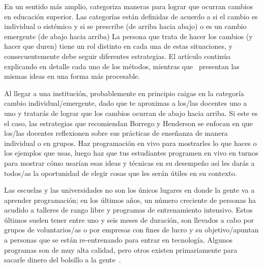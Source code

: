 En un sentido más amplio,
\cite{Borr2014} categoriza maneras para lograr que ocurran cambios en educación superior.
Las categorías están definidas de acuerdo a si el cambio es individual o sistémico y  si se prescribe (de arriba hacia abajo) o es un cambio emergente (de abajo hacia arriba)
La persona que trata de hacer los cambios (y hacer que duren)
tiene un rol distinto en cada una de estas situaciones,
y consecuentemente debe seguir diferentes estrategias.
El artículo continúa explicando en detalle cada uno de los métodos,
mientras que~\cite{Hend2015a,Hend2015b} presentan las mismas ideas en una forma más 
procesable.

Al llegar a una institución,
probablemente en principio caigas en la categoría cambio individual/emergente,
dado que te aproximas a los/las docentes uno a uno
y tratarás de lograr que los cambios ocurran de abajo hacia arriba.
Si este es el caso,
las estrategias que recomiendan Borrego y Henderson se enfocan
en que los/las docentes reflexionen sobre sus prácticas de enseñanza de manera individual o en grupos.
Haz programación en vivo para mostrarles lo que haces o los ejemplos que usas,
luego haz que tus estudiantes programen en vivo en turnos 
para mostrar cómo usarían esas ideas y técnicas en su desempeño
así les darás a todos/as la oportunidad de elegir cosas que les serán útiles en su contexto.


Las escuelas y las universidades no son los únicos lugares en donde la gente va a aprender programación;
en los últimos años, un número creciente de personas ha acudido a talleres de rango libre y programas de entrenamiento intensivo.
Estos últimos suelen tener entre uno y seis meses de duración,
son llevados a cabo por grupos de voluntarios/as o por empresas con fines de lucro
y su objetivo/apuntan a personas que se están re-entrenando para entrar en tecnología.
Algunos programas son de muy alta calidad,
pero otros existen primariamente para sacarle dinero del bolsillo a la gente~\cite{McMi2017}.
 
